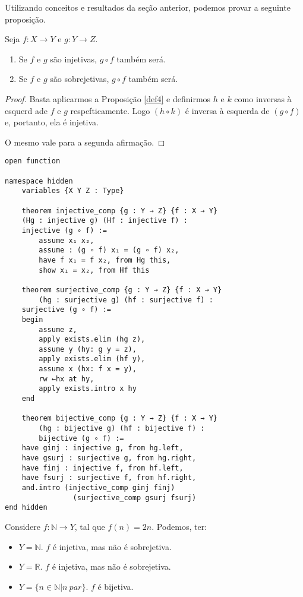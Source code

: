 Utilizando conceitos e resultados da seção anterior, podemos provar a seguinte proposição.

\begin{theorem}
    Seja $f: X \to Y$ e $g: Y \to Z$. 
    \renewcommand{\labelenumi}{\Roman{enumi}}
    \begin{enumerate}
        \item Se $f$ e $g$ são injetivas, $g \circ f$ também será.
        \item Se $f$ e $g$ são sobrejetivas, $g \circ f$ também será.
    \end{enumerate}
\end{theorem}

\begin{proof}
    Basta aplicarmos a Proposição \ref{def4} e definirmos $h$ e $k$ como 
    inversas à esquerd ade $f$ e $g$ respefticamente. Logo $(h \circ k)$ 
    é inversa à esquerda de  $(g \circ f)$ e, portanto, ela é injetiva. 

    O mesmo vale para a segunda afirmação.
\end{proof} 

\begin{lstlisting}
open function

namespace hidden
    variables {X Y Z : Type}

    theorem injective_comp {g : Y → Z} {f : X → Y}
    (Hg : injective g) (Hf : injective f) :
    injective (g ∘ f) :=
        assume x₁ x₂,
        assume : (g ∘ f) x₁ = (g ∘ f) x₂,
        have f x₁ = f x₂, from Hg this,
        show x₁ = x₂, from Hf this

    theorem surjective_comp {g : Y → Z} {f : X → Y}
        (hg : surjective g) (hf : surjective f) :
    surjective (g ∘ f) :=
    begin
        assume z, 
        apply exists.elim (hg z),
        assume y (hy: g y = z),
        apply exists.elim (hf y),
        assume x (hx: f x = y),
        rw ←hx at hy,
        apply exists.intro x hy
    end

    theorem bijective_comp {g : Y → Z} {f : X → Y}
        (hg : bijective g) (hf : bijective f) : 
        bijective (g ∘ f) :=
    have ginj : injective g, from hg.left,
    have gsurj : surjective g, from hg.right, 
    have finj : injective f, from hf.left,
    have fsurj : surjective f, from hf.right,
    and.intro (injective_comp ginj finj) 
                (surjective_comp gsurj fsurj)
end hidden       
\end{lstlisting}

\begin{example}
    Considere $f: \mathbb{N} \to Y$, tal que $f(n) = 2n$. Podemos, ter:
    \begin{itemize}
        \item $Y = \mathbb{N}$. $f$ é injetiva, mas não é sobrejetiva. 
        \item $Y = \mathbb{R}$. $f$ é injetiva, mas não é sobrejetiva.
        \item $Y = \{n \in \mathbb{N} | n~par\}$. $f$ é bijetiva. 
    \end{itemize} 
\end{example}

